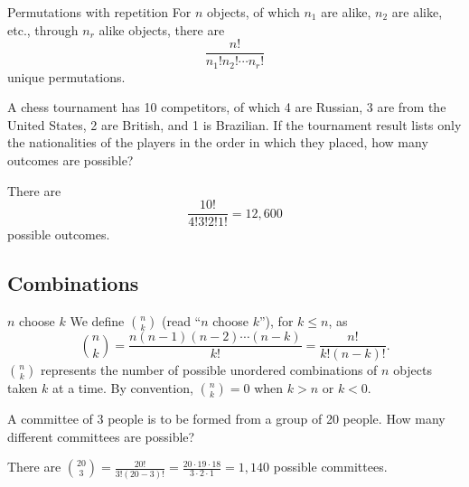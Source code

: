 \begin{bdef}{Permutations with repetition}\label{permutationsrepetition}
    For $n$ objects, of which $n_1$ are alike, $n_2$ are alike, etc., through $n_r$ alike objects, there are \[
        \frac{n!}{n_1!n_2!\cdots n_r!}    
    \] unique permutations.
\end{bdef}

\begin{changebar}
    \begin{example}
        A chess tournament has 10 competitors, of which 4 are Russian, 3 are from the United States, 2 are British, and 1 is Brazilian. If the tournament result lists only the nationalities of the players in the order in which they placed, how many outcomes are possible?    
    \end{example}
    \begin{solution}
        There are \[
            \frac{10!}{4!3!2!1!} = 12{,}600
            \] possible outcomes.
        \end{solution}
    \end{changebar}

\subsection{Combinations}
\begin{bdef}{$n$ choose $k$}
    We define $\binom{n}{k}$ (read ``$n$ choose $k$''), for $k \leq n$, as \[
        \binom{n}{k} = \frac{n(n-1)(n-2)\cdots(n-k)}{k!} = \frac{n!}{k!(n-k)!}.
    \] $\binom{n}{k}$ represents the number of possible unordered combinations of $n$ objects taken $k$ at a time. By convention, $\binom{n}{k} = 0$ when $k > n$ or $k < 0$.
\end{bdef}

\begin{changebar}
    \begin{example}
        A committee of 3 people is to be formed from a group of 20 people. How many different committees are possible?
    \end{example}
    \begin{solution}
        There are $\displaystyle \binom{20}{3} = \frac{20!}{3!(20-3)!} = \frac{20\cdot 19 \cdot 18}{3 \cdot 2 \cdot 1} = 1{,}140$ possible committees.
    \end{solution}
\end{changebar}

